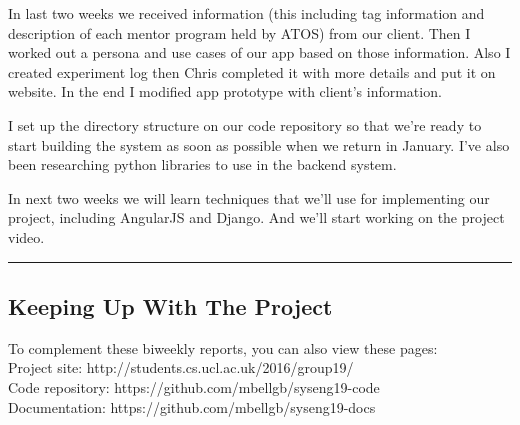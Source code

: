 \documentclass[11pt]{report}
\begin{document}
\bigskip
{}
\smallskip

\noindent
In last two weeks we received information (this including tag information and
description of each mentor program held by ATOS) from our client. Then I worked
out a persona and use cases of our app based on those information. Also I
created experiment log then Chris completed it with more details and put it on
website. In the end I modified app prototype with client’s information.

\bigskip
{}
\smallskip

\noindent
I set up the directory structure on our code repository so that we’re ready to
start building the system as soon as possible when we return in January. I’ve
also been researching python libraries to use in the backend system.

\bigskip
{}
\smallskip

\noindent
In next two weeks we will learn techniques that we’ll use for implementing our
project, including AngularJS and Django. And we’ll start working on the project
video.

\hrule

\subsection*{Keeping Up With The Project}

To complement these biweekly reports, you can also view these pages:\\

\noindent
Project site: http://students.cs.ucl.ac.uk/2016/group19/\\

\noindent
Code repository: https://github.com/mbellgb/syseng19-code\\

\noindent
Documentation: https://github.com/mbellgb/syseng19-docs
\end{document}
